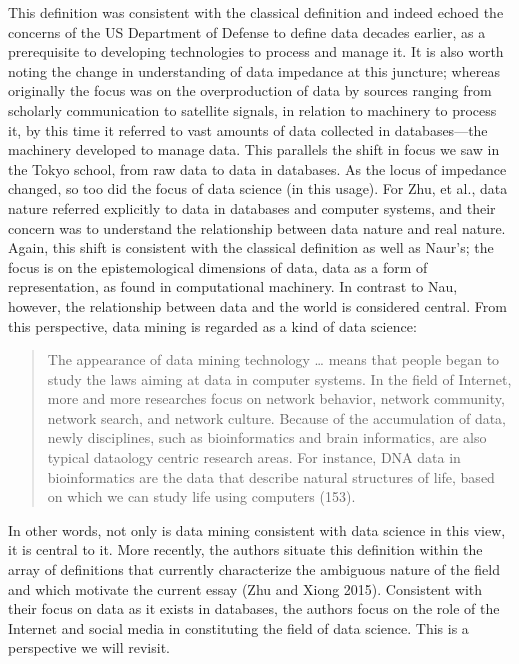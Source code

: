 \documentclass[
  letterpaper,
]{report}
\begin{document}
This definition was consistent with the classical definition and indeed
echoed the concerns of the US Department of Defense to define data
decades earlier, as a prerequisite to developing technologies to process
and manage it. It is also worth noting the change in understanding of
data impedance at this juncture; whereas originally the focus was on the
overproduction of data by sources ranging from scholarly communication
to satellite signals, in relation to machinery to process it, by this
time it referred to vast amounts of data collected in databases---the
machinery developed to manage data. This parallels the shift in focus we
saw in the Tokyo school, from raw data to data in databases. As the
locus of impedance changed, so too did the focus of data science (in
this usage). For Zhu, et al., data nature referred explicitly to data in
databases and computer systems, and their concern was to understand the
relationship between data nature and real nature. Again, this shift is
consistent with the classical definition as well as Naur's; the focus is
on the epistemological dimensions of data, data as a form of
representation, as found in computational machinery. In contrast to Nau,
however, the relationship between data and the world is considered
central. From this perspective, data mining is regarded as a kind of
data science:

\begin{quote}
The appearance of data mining technology \ldots{} means that people
began to study the laws aiming at data in computer systems. In the field
of Internet, more and more researches focus on network behavior, network
community, network search, and network culture. Because of the
accumulation of data, newly disciplines, such as bioinformatics and
brain informatics, are also typical dataology centric research areas.
For instance, DNA data in bioinformatics are the data that describe
natural structures of life, based on which we can study life using
computers (153).
\end{quote}

In other words, not only is data mining consistent with data science in
this view, it is central to it. More recently, the authors situate this
definition within the array of definitions that currently characterize
the ambiguous nature of the field and which motivate the current essay
(Zhu and Xiong 2015). Consistent with their focus on data as it exists
in databases, the authors focus on the role of the Internet and social
media in constituting the field of data science. This is a perspective
we will revisit.
\end{document}
